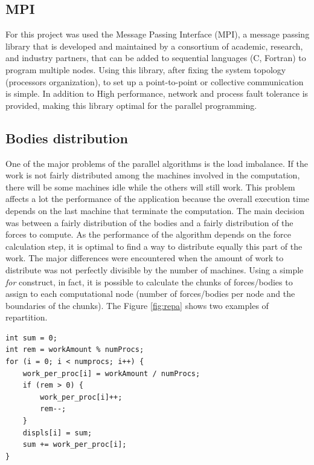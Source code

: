 \documentclass[a4paper]{article}
\begin{document}
\subsection{MPI}
\label{sec:mpi}
For this project was used the Message Passing Interface (MPI), a message passing library that is developed and maintained by a consortium of academic, research, and industry partners, that can be added to sequential languages (C, Fortran) to program multiple nodes. Using this library, after fixing the system topology (processors organization), to set up a point-to-point or collective communication is simple. In addition to High performance, network and process fault tolerance is provided, making this library optimal for the parallel programming.

\subsection{Bodies distribution}
\label{sec:bodies_distr}
One of the major problems of the parallel algorithms is the load imbalance. If the work is not fairly distributed among the machines involved in the computation, there will be some machines idle while the others will still work. This problem affects a lot the performance of the application because the overall execution time depends on the last machine that terminate the computation. 
The main decision was between a fairly distribution of the bodies and a fairly distribution of the forces to compute. As the performance of the algorithm depends on the force calculation step, it is optimal to find a way to distribute equally this part of the work. The major differences were encountered when the amount of work to distribute was not perfectly divisible by the number of machines.
Using a simple \textit{for} construct, in fact, it is possible to calculate the chunks of forces/bodies to assign to each computational node (number of forces/bodies per node and the boundaries of the chunks). The Figure \ref{fig:repa} shows two examples of repartition.

\begin{lstlisting}[label=fair, caption=fair distribution of work]
int sum = 0;
int rem = workAmount % numProcs; 
for (i = 0; i < numprocs; i++) {
    work_per_proc[i] = workAmount / numProcs;
    if (rem > 0) {
        work_per_proc[i]++;
        rem--;
    }
    displs[i] = sum;
    sum += work_per_proc[i];
}
\end{lstlisting}
\FloatBarrier
\end{document}
